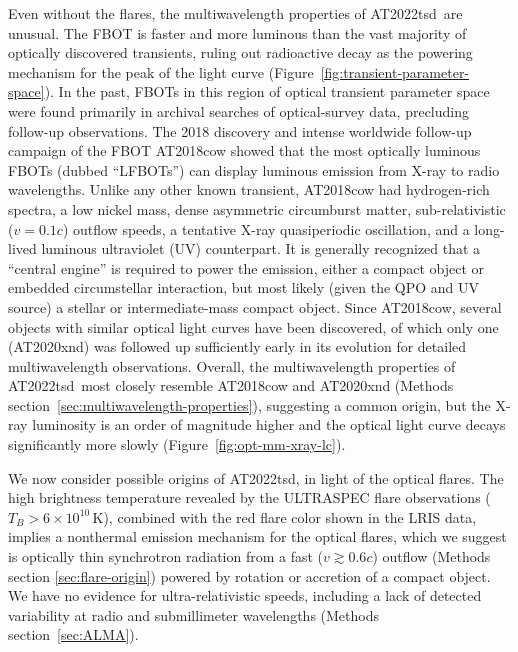 \documentclass{nature_plusfigure}
\newcommand{\at}{AT2022tsd}
\begin{document}
Even without the flares, the multiwavelength properties of \at\ are unusual. The FBOT is faster and more luminous than the vast majority of optically discovered transients, ruling out radioactive decay as the powering mechanism for the peak of the light curve (Figure~\ref{fig:transient-parameter-space}). In the past, FBOTs in this region of optical transient parameter space were found primarily in archival searches of optical-survey data\cite{Drout2014,Arcavi2016,Pursiainen2018,Ho2022_RET}, precluding follow-up observations. The 2018 discovery\cite{Prentice2018} and intense worldwide follow-up campaign of the FBOT AT2018cow showed that the most optically luminous FBOTs (dubbed ``LFBOTs'')\cite{Metzger2022} can display luminous emission from X-ray to radio wavelengths\cite{RiveraSandoval2018,Margutti2019,Ho2019}. Unlike any other known transient, AT2018cow had hydrogen-rich spectra\cite{Perley2019}, a low nickel mass\cite{Perley2019}, dense\cite{Ho2019} asymmetric\cite{Margutti2019,Maund2023} circumburst matter, sub-relativistic ($v=0.1c$)\cite{Ho2019} outflow speeds, a tentative X-ray quasiperiodic oscillation\cite{Pasham2021,Zhang2022}, and a long-lived luminous ultraviolet (UV) counterpart\cite{Sun2023}. It is generally recognized that a ``central engine'' is required to power the emission, either a compact object\cite{Prentice2018,Perley2019,Margutti2019,Ho2019} or embedded circumstellar interaction\cite{Margutti2019}, but most likely (given the QPO and UV source) a stellar\cite{Margutti2019,Pasham2021} or intermediate-mass\cite{Kuin2019,Perley2019,Zhang2022,Chen2023} compact object. 
Since AT2018cow, several objects with similar optical light curves have been discovered\cite{Coppejans2020,Ho2020_Koala,Perley2021,Yao2022}, of which only one (AT2020xnd\cite{Perley2021}) was followed up sufficiently early in its evolution for detailed multiwavelength observations\cite{Bright2022,Ho2022_AT2020xnd}. Overall, the multiwavelength properties of \at\ most closely resemble AT2018cow and AT2020xnd (Methods section~\ref{sec:multiwavelength-properties}), suggesting a common origin, but the X-ray luminosity is an order of magnitude higher and the optical light curve decays significantly more slowly (Figure~\ref{fig:opt-mm-xray-lc}).

We now consider possible origins of \at, in light of the optical flares. The high brightness temperature revealed by the ULTRASPEC flare observations ($T_B>6\times10^{10}\,$K), combined with the red flare color shown in the LRIS data, implies a nonthermal emission mechanism for the optical flares, which we suggest is optically thin synchrotron radiation from a fast ($v\gtrsim0.6c$) outflow (Methods section \ref{sec:flare-origin}) powered by rotation or accretion of a compact object.
We have no evidence for ultra-relativistic speeds, including a lack of detected variability at radio and submillimeter wavelengths (Methods section~\ref{sec:ALMA}).
\end{document}
